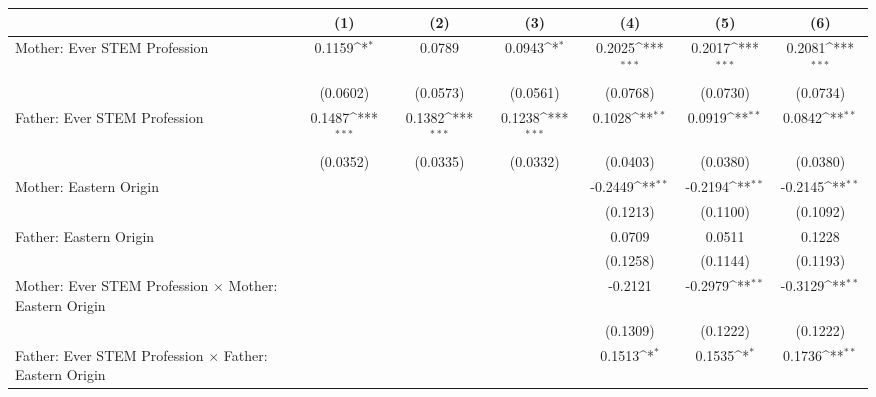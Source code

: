 {
\def\sym#1{\ifmmode^{#1}\else\(^{#1}\)\fi}
\begin{tabular}{l*{6}{c}}
\toprule
                    &\multicolumn{1}{c}{(1)}         &\multicolumn{1}{c}{(2)}         &\multicolumn{1}{c}{(3)}         &\multicolumn{1}{c}{(4)}         &\multicolumn{1}{c}{(5)}         &\multicolumn{1}{c}{(6)}         \\
\midrule
Mother: Ever STEM Profession&      0.1159\sym{*}  &      0.0789         &      0.0943\sym{*}  &      0.2025\sym{***}&      0.2017\sym{***}&      0.2081\sym{***}\\
                    &    (0.0602)         &    (0.0573)         &    (0.0561)         &    (0.0768)         &    (0.0730)         &    (0.0734)         \\
\addlinespace
Father: Ever STEM Profession&      0.1487\sym{***}&      0.1382\sym{***}&      0.1238\sym{***}&      0.1028\sym{**} &      0.0919\sym{**} &      0.0842\sym{**} \\
                    &    (0.0352)         &    (0.0335)         &    (0.0332)         &    (0.0403)         &    (0.0380)         &    (0.0380)         \\
\addlinespace
Mother: Eastern Origin&                     &                     &                     &     -0.2449\sym{**} &     -0.2194\sym{**} &     -0.2145\sym{**} \\
                    &                     &                     &                     &    (0.1213)         &    (0.1100)         &    (0.1092)         \\
\addlinespace
Father: Eastern Origin&                     &                     &                     &      0.0709         &      0.0511         &      0.1228         \\
                    &                     &                     &                     &    (0.1258)         &    (0.1144)         &    (0.1193)         \\
\addlinespace
Mother: Ever STEM Profession $\times$ Mother: Eastern Origin&                     &                     &                     &     -0.2121         &     -0.2979\sym{**} &     -0.3129\sym{**} \\
                    &                     &                     &                     &    (0.1309)         &    (0.1222)         &    (0.1222)         \\
\addlinespace
Father: Ever STEM Profession $\times$ Father: Eastern Origin&                     &                     &                     &      0.1513\sym{*}  &      0.1535\sym{*}  &      0.1736\sym{**} \\

\end{tabular}}
